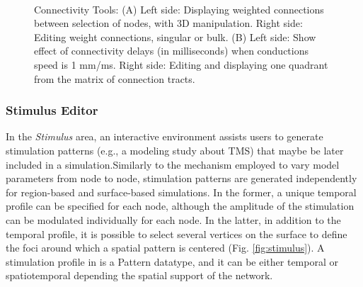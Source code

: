  \begin{figure}[!htbp]
    \centering
    \\
    \caption{Connectivity Tools: 
    (A) Left side: Displaying weighted connections between selection of nodes, with 3D manipulation.
    Right side: Editing weight connections, singular or bulk.
    (B) Left side: Show effect of connectivity delays (in milliseconds) when conductions speed is 1 mm/ms.
    Right side: Editing and displaying one quadrant from the matrix of connection tracts.}
        \label{fig:connectivity}
\end{figure}

\subsubsection{Stimulus Editor}

  In the \emph{Stimulus} area, an interactive environment assists users to
  generate stimulation patterns (e.g., a modeling study about TMS) that maybe be
  later included in a simulation.Similarly to the mechanism employed to vary
  model parameters from node to node, stimulation patterns are generated
  independently for region-based and surface-based simulations. In the former, a
  unique temporal profile can be specified for each node, although the amplitude
  of the stimulation can be modulated individually for each node. In the latter,
  in addition to the temporal profile, it is possible to select several vertices
  on the surface to define the foci around which a spatial pattern is centered
  (Fig. \ref{fig:stimulus}). A stimulation profile in \TVB is a Pattern
  datatype, and it can be either temporal or spatiotemporal depending the
  spatial support of the network.

